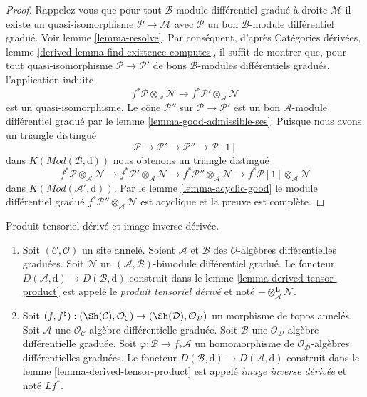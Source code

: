\begin{proof}
Rappelez-vous que pour tout $\mathcal{B}$-module différentiel gradué à droite $\mathcal{M}$ il existe un quasi-isomorphisme $\mathcal{P} \to \mathcal{M}$ avec $\mathcal{P}$ un bon $\mathcal{B}$-module différentiel gradué.
Voir lemme \ref{lemma-resolve}.
Par conséquent, d'après Catégories dérivées, lemme \ref{derived-lemma-find-existence-computes}, il suffit de montrer que, pour tout quasi-isomorphisme $\mathcal{P} \to \mathcal{P}'$ de bons $\mathcal{B}$-modules différentiels gradués, l'application induite
$$
f^*\mathcal{P} \otimes_\mathcal{A} \mathcal{N}
\longrightarrow
f^*\mathcal{P}' \otimes_\mathcal{A} \mathcal{N}
$$
est un quasi-isomorphisme.
Le cône $\mathcal{P}''$ sur $\mathcal{P} \to \mathcal{P}'$ est un bon $\mathcal{A}$-module différentiel gradué par le lemme \ref{lemma-good-admissible-ses}.
Puisque nous avons un triangle distingué
$$
\mathcal{P} \to \mathcal{P}' \to \mathcal{P}'' \to \mathcal{P}[1]
$$
dans $K(\textit{Mod}(\mathcal{B}, \text{d}))$ nous obtenons un triangle distingué
$$
f^*\mathcal{P} \otimes_\mathcal{A} \mathcal{N} \to
f^*\mathcal{P}' \otimes_\mathcal{A} \mathcal{N} \to
f^*\mathcal{P}'' \otimes_\mathcal{A} \mathcal{N} \to
f^*\mathcal{P}[1] \otimes_\mathcal{A} \mathcal{N}
$$
dans $K(\textit{Mod}(\mathcal{A}', \text{d}))$.
Par le lemme \ref{lemma-acyclic-good}  le module différentiel gradué $f^*\mathcal{P}'' \otimes_\mathcal{A} \mathcal{N}$ est acyclique et la preuve est complète.
\end{proof}

\begin{definition}
\label{definition-pullback}
Produit tensoriel dérivé et image inverse dérivée.
\begin{enumerate}
\item Soit $(\mathcal{C}, \mathcal{O})$ un site annelé.
Soient $\mathcal{A}$ et $\mathcal{B}$ des $\mathcal{O}$-algèbres différentielles graduées.
Soit $\mathcal{N}$ un $(\mathcal{A}, \mathcal{B})$-bimodule différentiel gradué.
Le foncteur $D(\mathcal{A}, \text{d}) \to D(\mathcal{B}, \text{d})$ construit dans le lemme \ref{lemma-derived-tensor-product} est appelé le {\it produit tensoriel dérivé} et noté $- \otimes_\mathcal{A}^\mathbf{L} \mathcal{N}$.
\item Soit $(f, f^\sharp) : (\Sh(\mathcal{C}), \mathcal{O}_\mathcal{C}) \to (\Sh(\mathcal{D}), \mathcal{O}_\mathcal{D})$ un morphisme de topos annelés.
Soit $\mathcal{A}$ une $\mathcal{O}_\mathcal{C}$-algèbre différentielle graduée.
Soit $\mathcal{B}$ une $\mathcal{O}_\mathcal{D}$-algèbre différentielle graduée.
Soit $\varphi : \mathcal{B} \to f_*\mathcal{A}$ un homomorphisme de $\mathcal{O}_\mathcal{D}$-algèbres différentielles graduées.
Le foncteur $D(\mathcal{B}, \text{d}) \to D(\mathcal{A}, \text{d})$ construit dans le lemme \ref{lemma-derived-tensor-product} est appelé {\it image inverse dérivée} et noté $Lf^*$.
\end{enumerate}
\end{definition}

